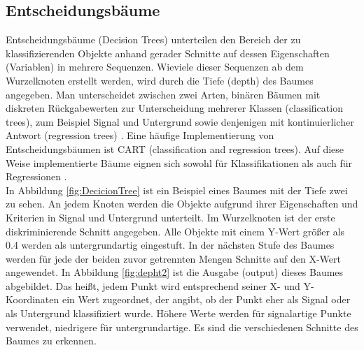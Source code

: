 \subsection{Entscheidungsb\"aume}
\label{ch:Algorithmen:subsec:Entscheidungsbaum}

Entscheidungsb\"aume (Decision Trees) unterteilen den Bereich der zu klassifizierenden Objekte anhand gerader Schnitte auf dessen Eigenschaften (Variablen) in mehrere Sequenzen. Wieviele dieser Sequenzen ab dem Wurzelknoten erstellt werden, wird durch die Tiefe (depth) des Baumes angegeben. Man unterscheidet zwischen zwei Arten, bin\"aren B\"aumen mit diskreten R\"uckgabewerten zur Unterscheidung mehrerer Klassen (classification trees), zum Beispiel Signal und Untergrund sowie denjenigen mit kontinuierlicher Antwort (regression trees) \cite{SWB-455193959}. Eine h\"aufige Implementierung von Entscheidungsb\"aumen ist CART (classification and regression trees). Auf diese Weise implementierte B\"aume eignen sich sowohl f\"ur Klassifikationen als auch f\"ur Regressionen \cite{CART}.\\
In Abbildung \ref{fig:DecicionTree} ist ein Beispiel eines Baumes mit der Tiefe zwei zu sehen. An jedem Knoten werden die Objekte aufgrund ihrer Eigenschaften und Kriterien in Signal und Untergrund unterteilt. Im Wurzelknoten ist der erste diskriminierende Schnitt angegeben. Alle Objekte mit einem Y-Wert gr\"o\ss er als \num{0,4} werden als untergrundartig eingestuft. In der n\"achsten Stufe des Baumes werden f\"ur jede der beiden zuvor getrennten Mengen Schnitte auf den X-Wert angewendet. In Abbildung \ref{fig:depht2} ist die Ausgabe (output) dieses Baumes abgebildet. Das hei\ss t, jedem Punkt wird entsprechend seiner X- und Y-Koordinaten ein Wert zugeordnet, der angibt, ob der Punkt eher als Signal oder als Untergrund klassifiziert wurde. H\"ohere Werte werden f\"ur signalartige Punkte verwendet, niedrigere f\"ur untergrundartige. Es sind die verschiedenen Schnitte des Baumes zu erkennen.\\

